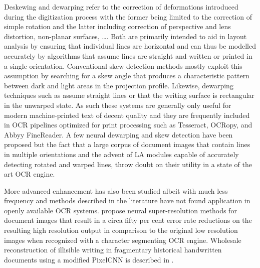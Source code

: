Deskewing and dewarping refer to the correction of deformations introduced
during the digitization process with the former being limited to the correction
of simple rotation and the latter including correction of perspective and lens
distortion, non-planar surfaces, \dots. Both are primarily intended to aid in
layout analysis by ensuring that individual lines are horizontal and can thus
be modelled accurately by algorithms that assume lines are straight and written
or printed in a single orientation. Conventional skew detection methods
\cite{bloomberg1995measuring,amin2000document,papandreou2011novel} mostly
exploit this assumption by searching for a skew angle that produces a
characteristic pattern between dark and light areas in the projection profile.
Likewise, dewarping techniques such as
\cite{zhang2003correcting,ulges2005document,masalovitch2007usage} assume
straight lines or that the writing surface is rectangular
\cite{stamatopoulos2008two} in the unwarped state. As such these systems are
generally only useful for modern machine-printed text of decent quality and
they are frequently included in OCR pipelines optimized for print processing
such as Tesseract, OCRopy, and Abbyy FineReader. A few neural dewarping
\cite{das2019dewarpnet,ma2018docunet} and skew detection \cite{ocropus3} have
been proposed but the fact that a large corpus of document images that contain
lines in multiple orientations and the advent of LA modules capable of
accurately detecting rotated and warped lines, throw doubt on their utility in
a state of the art OCR engine.

More advanced enhancement has also been studied albeit with much less frequency
and methods described in the literature have not found application in openly
available OCR systems. \cite{dong2015boosting,lat2018enhancing,fu2019cascaded}
propose neural super-resolution methods for document images that result in a
circa fifty per cent error rate reductions on the resulting high resolution
output in comparison to the original low resolution images when recognized with
a character segmenting OCR engine. Wholesale reconstruction of illisible
writing in fragmentary historical handwritten documents using a modified
PixelCNN is described in \cite{uzan2017qumran}. 

